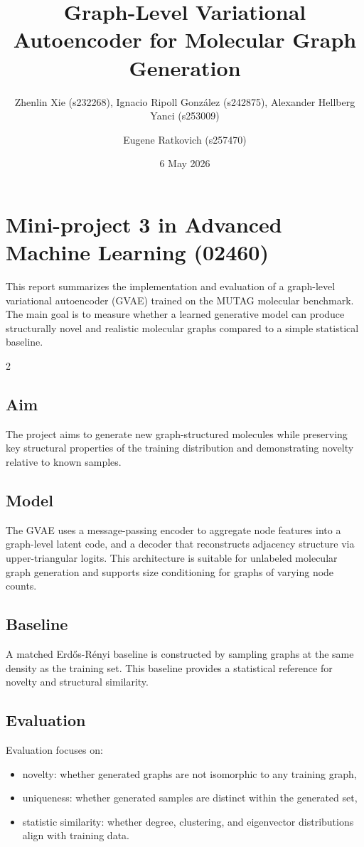 \documentclass[10pt,a4paper]{article}
\title{Graph-Level Variational Autoencoder for Molecular Graph Generation}
\author{Zhenlin Xie (s232268), Ignacio Ripoll Gonz\'alez (s242875), Alexander Hellberg Yanci (s253009) \and Eugene Ratkovich (s257470)}
\date{6 May 2026}
\begin{document}
\section*{Mini-project 3 in Advanced Machine Learning (02460)}
This report summarizes the implementation and evaluation of a graph-level variational autoencoder (GVAE) trained on the MUTAG molecular benchmark.
The main goal is to measure whether a learned generative model can produce structurally novel and realistic molecular graphs compared to a simple statistical baseline.

\begin{multicols}{2}

\subsection*{Aim}
The project aims to generate new graph-structured molecules while preserving key structural properties of the training distribution and demonstrating novelty relative to known samples.

\subsection*{Model}
The GVAE uses a message-passing encoder to aggregate node features into a graph-level latent code, and a decoder that reconstructs adjacency structure via upper-triangular logits.
This architecture is suitable for unlabeled molecular graph generation and supports size conditioning for graphs of varying node counts.

\subsection*{Baseline}
A matched Erd\H{o}s-R\'enyi baseline is constructed by sampling graphs at the same density as the training set. This baseline provides a statistical reference for novelty and structural similarity.

\subsection*{Evaluation}
Evaluation focuses on:
\begin{itemize}
  \item novelty: whether generated graphs are not isomorphic to any training graph,
  \item uniqueness: whether generated samples are distinct within the generated set,
  \item statistic similarity: whether degree, clustering, and eigenvector distributions align with training data.
\end{itemize}

\end{multicols}
\end{document}
